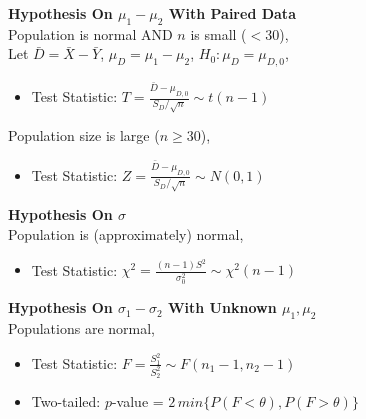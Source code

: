 \documentclass[a4paper, 12pt]{article}
\begin{document}
\begin{multicols*}{4}
\begin{itemize}
\end{itemize}
\textbf{Hypothesis On $\mu_1-\mu_2$ With Paired Data}\\
Population is normal AND $n$ is small ($<30$),\\
Let $\bar{D}=\bar{X}-\bar{Y}$, $\mu_D=\mu_1-\mu_2$, $H_0:\mu_D=\mu_{D,0}$,
\begin{itemize}
    \item Test Statistic: $T = \frac{\bar{D}-\mu_{D,0}}{S_D/\sqrt{n}} \sim t(n-1)$
\end{itemize}
Population size is large ($n\geq 30$),
\begin{itemize}
    \item Test Statistic: $Z = \frac{\bar{D}-\mu_{D,0}}{S_D/\sqrt{n}} \sim N(0,1)$
\end{itemize}
\textbf{Hypothesis On $\sigma$}\\
Population is (approximately) normal,
\begin{itemize}
    \item Test Statistic: $\chi^2=\frac{(n-1)S^2}{\sigma_0^2} \sim \chi^2(n-1)$
\end{itemize}
\textbf{Hypothesis On $\sigma_1-\sigma_2$ With Unknown $\mu_1,\mu_2$}\\
Populations are normal,
\begin{itemize}
    \item Test Statistic: $F = \frac{S_1^2}{S_2^2} \sim F(n_1-1,n_2-1)$
    \item Two-tailed: $p$-value = $2\,min\{P(F<\theta),P(F>\theta)\}$
\end{itemize}

\medskip


\end{multicols*}
\end{document}
